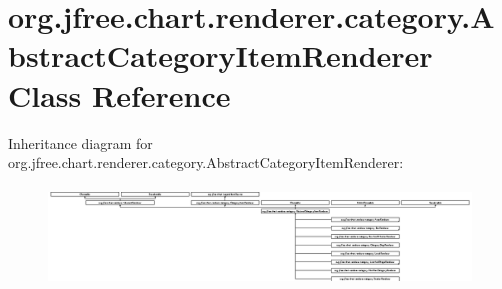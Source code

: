 \hypertarget{classorg_1_1jfree_1_1chart_1_1renderer_1_1category_1_1_abstract_category_item_renderer}{}\section{org.\+jfree.\+chart.\+renderer.\+category.\+Abstract\+Category\+Item\+Renderer Class Reference}
\label{classorg_1_1jfree_1_1chart_1_1renderer_1_1category_1_1_abstract_category_item_renderer}
Inheritance diagram for org.\+jfree.\+chart.\+renderer.\+category.\+Abstract\+Category\+Item\+Renderer\+:\begin{figure}[H]
\begin{center}
\leavevmode
\includegraphics[height=2.646048cm]{classorg_1_1jfree_1_1chart_1_1renderer_1_1category_1_1_abstract_category_item_renderer}
\end{center}
\end{figure}
